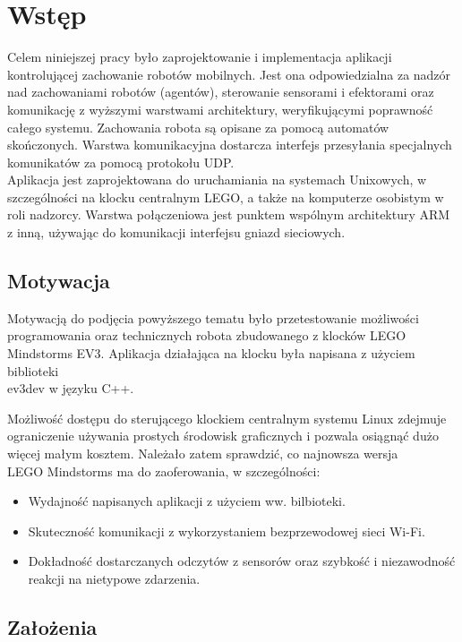 \chapter{Wstęp}
\label{ch:wstep}

Celem niniejszej pracy było zaprojektowanie i implementacja aplikacji kontrolującej zachowanie robotów mobilnych. Jest ona odpowiedzialna za nadzór nad zachowaniami robotów (agentów), sterowanie sensorami i efektorami oraz komunikację z wyższymi warstwami architektury, weryfikującymi poprawność całego systemu. Zachowania robota są opisane za pomocą automatów skończonych. Warstwa komunikacyjna dostarcza interfejs przesyłania specjalnych komunikatów za pomocą protokołu UDP.\\

Aplikacja jest zaprojektowana do uruchamiania na systemach Unixowych, w szczególności na klocku centralnym LEGO, a także na komputerze osobistym w roli nadzorcy. Warstwa połączeniowa jest punktem wspólnym architektury ARM z inną, używając do komunikacji interfejsu gniazd sieciowych.
\clearpage

\section{Motywacja}

Motywacją do podjęcia powyższego tematu było przetestowanie możliwości programowania oraz technicznych robota zbudowanego z klocków LEGO Mindstorms EV3. Aplikacja działająca na klocku była napisana z użyciem biblioteki\\
ev3dev \cite{ev3dev} w języku C++.

Możliwość dostępu do sterującego klockiem centralnym systemu Linux zdejmuje ograniczenie używania prostych środowisk graficznych i pozwala osiągnąć dużo więcej małym kosztem. Należało zatem sprawdzić, co najnowsza wersja \\LEGO Mindstorms ma do zaoferowania, w szczególności:
\begin{itemize}
    \item Wydajność napisanych aplikacji z użyciem ww. bilbioteki.
    \item Skuteczność komunikacji z wykorzystaniem bezprzewodowej sieci Wi-Fi.
    \item Dokładność dostarczanych odczytów z sensorów oraz szybkość i niezawodność reakcji na nietypowe zdarzenia.
\end{itemize}

\section{Założenia}


